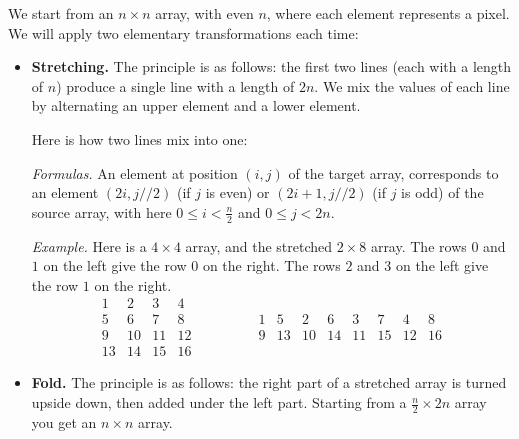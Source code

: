 \documentclass[11pt,class=report,crop=false]{standalone}
\begin{document}
\begin{cours}

We start from an $n\times n$ array, with even $n$, where each element represents a pixel. We will apply two elementary transformations each time:

\begin{itemize}
  \item \textbf{Stretching.} The principle is as follows: the first two lines (each with a length of $n$) produce a single line with a length of $2n$. We mix the values of each line by alternating an upper element and a lower element.

\medskip
 

Here is how two lines mix into one:

\medskip

\emph{Formulas.} An element at position $(i,j)$ of the target array, corresponds to an element $(2i,j//2)$ (if $j$ is even) or $(2i+1,j//2)$ (if $j$ is odd) of the source array, with here $0 \le i < \frac n2$ and $0 \le j < 2n$.

\medskip

\emph{Example.} Here is a $4 \times 4$ array, and the stretched $2 \times 8$ array.
The rows $0$ and $1$ on the left give the row $0$ on the right.
The rows $2$ and $3$ on the left give the row $1$ on the right.
$$\begin{array}{cccc} 
  1& 2& 3& 4\\ 
  5& 6& 7& 8\\  
  9&10&11&12\\  
 13&14&15&16  
\end{array}\qquad\qquad 
\begin{array}{cccccccc} 
  1& 5& 2& 6& 3& 7& 4& 8  \\
  9&13&10&14&11&15&12&16
\end{array}$$
  
  \item \textbf{Fold.} The principle is as follows: the right part of a stretched array is turned upside down, then added under the left part. Starting from a $\frac n2 \times 2n$ array you get an $n \times n$ array.

 


\end{itemize}
\end{cours}
\end{document}
